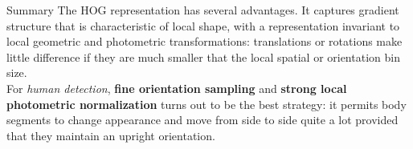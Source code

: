 \begin{frame}{Summary}
  \small
  The HOG representation has several advantages. It captures gradient
  structure that is characteristic of local shape, with a representation invariant
  to local geometric and photometric transformations: translations or rotations make little difference
  if they are much smaller that the local spatial or orientation bin size. \\
  \vspace{5mm}
  For \textit{human detection}, \textbf{fine orientation sampling} and \textbf{strong
  local photometric normalization} turns out to be the best strategy: it permits body
  segments to change appearance and move from side to side quite a lot provided
  that they maintain an upright orientation.

\end{frame}
